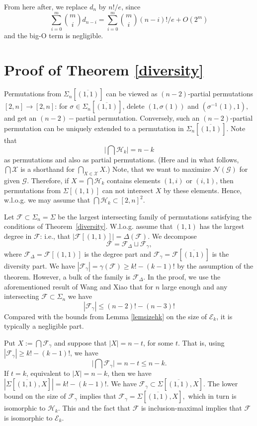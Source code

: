 \documentclass[11pt]{extarticle}
\numberwithin{equation}{section} %
\theoremstyle{plain}
\theoremstyle{definition}
\newcommand{\FF}{\mathcal{F}}
\newcommand{\ff}{\mathcal{F}}
\newcommand{\m}{\mathcal}
\newcommand{\HH}{\mathcal{H}}
\begin{document}
From here after, we replace $d_{n}$ by $n!/e$, since 
$$
\sum_{i=0}^m {m \choose i}d_{n-i} = \sum_{i=0}^m {m \choose i}(n-i)!/e + O(2^m)
$$
and the big-O term is negligible. 




\section{Proof of Theorem \ref{diversity}}\label{sec3}

Permutations from $\Sigma_n[\overline{(1, 1)}]$ can be viewed as $(n-2)$-partial permutations $[2,n] \to [2,n]$: for $\sigma \in \Sigma_n[\overline{(1, 1)}]$,  delete $(1, \sigma(1))$ and $(\sigma^{-1}(1), 1),$ and get an $(n-2)-$partial permutation. Conversely, such an $(n-2)$-partial permutation can be uniquely extended to a permutation in $\Sigma_n[\overline{(1, 1)}]$.  Note that $$\Big|\bigcap \HH_k\Big| = n-k$$ as permutations and also as partial permutations. (Here and in what follows, $\bigcap \m X$ is a shorthand for $\bigcap_{X\in \m X}X$.) Note, that we want to maximize $\m{N}(\m{G})$ for given $\m{G}$. Therefore, if $X = \bigcap \HH_k$ contains elements $(1, i)$ or $(i, 1)$, then permutations from $\Sigma[(1,1)]$ can not intersect $X$ by these elements. Hence, w.l.o.g. we may assume that $\bigcap \HH_k \subset [2, n]^2$.

Let $\FF \subset \Sigma_n=\Sigma$ be the largest intersecting family of permutations satisfying the conditions of Theorem~\ref{diversity}. W.l.o.g. assume that $(1, 1)$ has the largest degree in $\FF$: i.e., that $|\FF[(1,1)]| = \Delta(\FF)$. We decompose  $$\FF = \FF_\Delta  \sqcup \FF_\gamma,$$   where $\FF_\Delta = \FF[(1, 1)] $ is the degree part and $\FF_\gamma = \FF[\overline{(1, 1)}]$ is the diversity part. 
We have $|\FF_\gamma|= \gamma(\FF) \geq k! - (k-1)!$ by the assumption of the theorem.  However, a bulk of the family is $\ff_\Delta.$ In the proof, we use the aforementioned result of Wang and Xiao \cite{WX} that for $n$ large enough and any intersecting $\FF \subset \Sigma_n$ we have  $$|\FF_\gamma|\leq(n-2)!-(n-3)!$$ Compared with the bounds from Lemma \ref{lemsizehk} on the size of $\m E_k$, it is typically a negligible part. 


Put $X:=\bigcap \FF_\gamma$  and suppose that $|X| = n-t$, for some $t$.  That is, using $|\FF_\gamma| \geq k! - (k-1)!$, we have 
$$\Big|\bigcap \FF_\gamma\Big| = n - t \leq n - k.$$ If $t=k$, equivalent to $|X|=n - k$, then we have $|\Sigma[\overline{(1,1)},X]|= k! - (k-1)!$. We have $\ff_\gamma\subset \Sigma[\overline{(1,1)},X]$. The lower bound on the size of $\ff_\gamma$ implies that  $\ff_\gamma = \Sigma[\overline{(1,1)},X],$ which in turn is  isomorphic to $\m H_k.$ This and the fact that $\ff$ is inclusion-maximal implies that $\ff$ is isomorphic to $\m E_k.$
\end{document}
